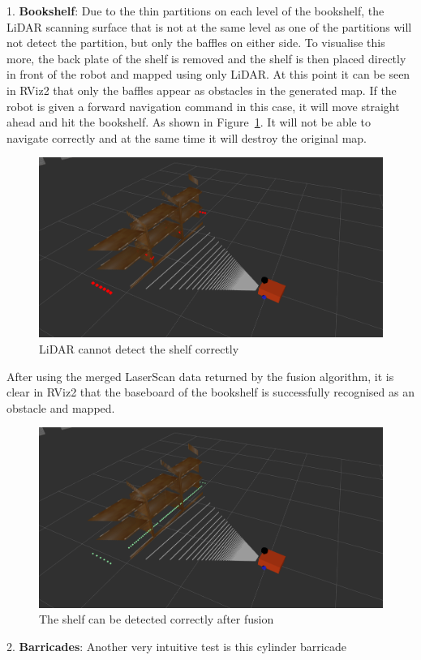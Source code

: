 1. \textbf{Bookshelf}: Due to the thin partitions on each level of the bookshelf, 
the LiDAR scanning surface that is not at the same level as one of the partitions will not detect the partition, 
but only the baffles on either side. To visualise this more, the back plate of the shelf is removed 
and the shelf is then placed directly in front of the robot and mapped using only LiDAR. 
At this point it can be seen in RViz2 that only the baffles appear as obstacles in the generated map. 
If the robot is given a forward navigation command in this case, it will move straight ahead and hit the bookshelf. 
As shown in Figure~\ref{fig:bookshelf}. It will not be able to navigate correctly and at the same time it will destroy the original map.
\begin{figure}[H]
    \centering
    \includegraphics[width=0.8\linewidth]{figs/cannot_shelf.png}
    \caption{LiDAR cannot detect the shelf correctly}
    \label{fig:bookshelf}
\end{figure}
After using the merged LaserScan data returned by the fusion algorithm, 
it is clear in RViz2 that the baseboard of the bookshelf is successfully recognised as an obstacle and mapped.
\begin{figure}[H]
    \centering
    \includegraphics[width=0.8\linewidth]{figs/can_shelf.png}
    \caption{The shelf can be detected correctly after fusion}
\end{figure}
2. \textbf{Barricades}: Another very intuitive test is this cylinder barricade 
